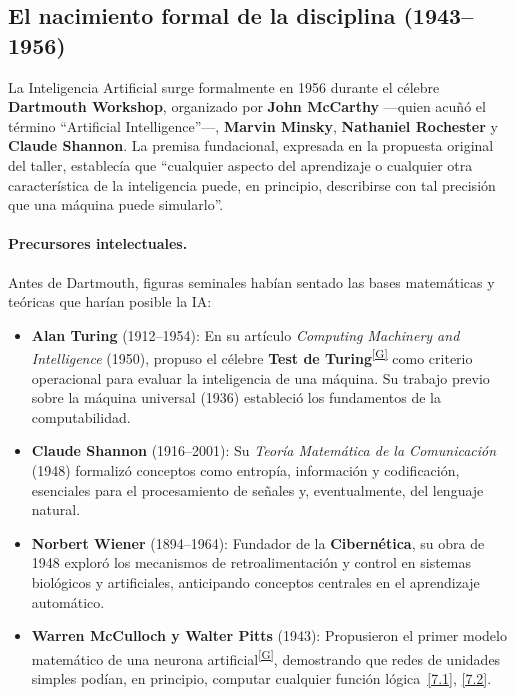 \documentclass[12pt,a4paper]{report}
\numberwithin{figure}{section}
\begin{document}
\subsection[Nacimiento de la disciplina (1943--1956)]{El nacimiento formal de la disciplina (1943--1956)}
\label{subsec:nacimiento_ia}

La Inteligencia Artificial surge formalmente en 1956 durante el célebre \textbf{Dartmouth Workshop}, organizado por \textbf{John McCarthy} ---quien acuñó el término ``Artificial Intelligence''---, \textbf{Marvin Minsky}, \textbf{Nathaniel Rochester} y \textbf{Claude Shannon}. La premisa fundacional, expresada en la propuesta original del taller, establecía que ``cualquier aspecto del aprendizaje o cualquier otra característica de la inteligencia puede, en principio, describirse con tal precisión que una máquina puede simularlo''.

\paragraph{Precursores intelectuales.}
Antes de Dartmouth, figuras seminales habían sentado las bases matemáticas y teóricas que harían posible la IA:
\begin{itemize}
    \item \textbf{Alan Turing} (1912--1954): En su artículo \textit{Computing Machinery and Intelligence} (1950), propuso el célebre \textbf{Test de Turing}\textsuperscript{\hyperref[glos:turing]{[G]}} como criterio operacional para evaluar la inteligencia de una máquina. Su trabajo previo sobre la máquina universal (1936) estableció los fundamentos de la computabilidad.
    
    \item \textbf{Claude Shannon} (1916--2001): Su \textit{Teoría Matemática de la Comunicación} (1948) formalizó conceptos como entropía, información y codificación, esenciales para el procesamiento de señales y, eventualmente, del lenguaje natural.
    
    \item \textbf{Norbert Wiener} (1894--1964): Fundador de la \textbf{Cibernética}, su obra de 1948 exploró los mecanismos de retroalimentación y control en sistemas biológicos y artificiales, anticipando conceptos centrales en el aprendizaje automático.
    
    \item \textbf{Warren McCulloch y Walter Pitts} (1943): Propusieron el primer modelo matemático de una neurona artificial\textsuperscript{\hyperref[glos:rna]{[G]}}, demostrando que redes de unidades simples podían, en principio, computar cualquier función lógica~\hyperref[ref:7.1]{[7.1]}, \hyperref[ref:7.2]{[7.2]}.
\end{itemize}
\end{document}
